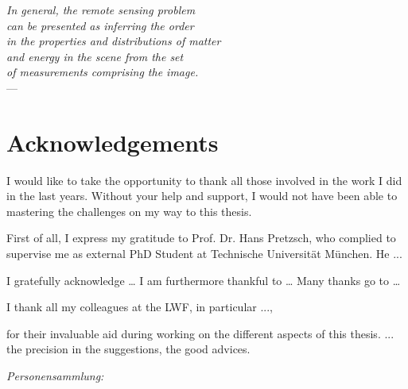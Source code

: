 
\begin{flushright}{\slshape    
		In general, the remote sensing problem \\
		can be presented as inferring the order \\ 
		in the properties and distributions of matter \\ 
		and energy in the scene from the set \\
		of measurements comprising the image.} \\ \medskip
	---  \citep{Strahler.1986}
\end{flushright}


\begingroup
\let\clearpage\relax
\let\cleardoublepage\relax
\let\cleardoublepage\relax

\chapter*{Acknowledgements}

I would like to take the opportunity to thank all those involved in the work I did in the last years. Without your help and support, I would not have been able to mastering the challenges on my way to this thesis.

First of all, I express my gratitude to Prof. Dr. Hans Pretzsch, who complied to supervise me as external PhD Student at Technische Universität München. He ...

I gratefully acknowledge \dots
I am furthermore thankful to \dots
Many thanks go to \dots

I thank all my colleagues at the LWF, in particular ..., 

for their invaluable aid during working on the different aspects of this thesis. 
... the precision in the suggestions, the good advices.

\emph{Personensammlung:}

